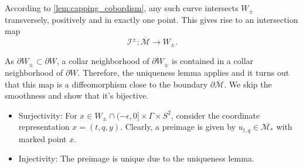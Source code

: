 According to \cref*{lem:capping_cobordism}, any such curve intersects $W_\pm$ transversely, positively and in exactly one point.
This gives rise to an intersection map
\[
    \mathcal{I}^\pm\colon \overline{\mathcal{M}} \to W_\pm.
\]

As $\partial W_\pm \subset \partial W$, a collar neighborhood of $\partial W_\pm$ is contained in a collar neighborhood of $\partial W$.
Therefore, the uniqueness lemma applies and it turns out that this map is a diffeomorphism close to the boundary $\partial \overline{\mathcal M}$.
We skip the smoothness and show that it's bijective.
\begin{itemize}
    \item Surjectivity: For $x \in W_\pm \cap (-\epsilon, 0] \times \Gamma \times S^2$, consider the coordinate representation $x = (t, q, y)$.
    Clearly, a preimage is given by $u_{t,q} \in \overline{\mathcal M_*}$ with marked point $x$. 
    \item Injectivity: The preimage is unique due to the uniqueness lemma.
\end{itemize}